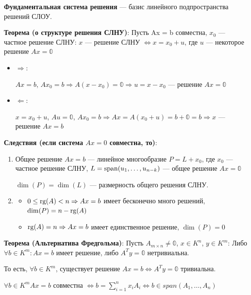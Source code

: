 \textbf{Фундаментальная система решения} --- базис линейного подпространства решений СЛОУ.

\textbf{Теорема (о структуре решения СЛНУ)}: Пусть Ax = b совместна, \(x_0\) --- частное решение СЛНУ: \(x\) --- решение СЛНУ \(\Leftrightarrow x = x_0 + u\), где \(u\) --- некоторое решение \(Ax = \mathbb{0}\)

\prooff{}
\begin{itemize}
    \item \(\Rightarrow\):

          \(Ax = b\), \(Ax_0 = b \Rightarrow A(x - x_0) = \mathbb{0} \Rightarrow u = x - x_0\) --- решение \(Ax = \mathbb{0}\)

    \item \(\Leftarrow\):

          \(x = x_0 + u\), \(Au = \mathbb{0}\), \(Ax_0 = b \Rightarrow Ax = A(x_0 + u) = b + \mathbb{0} = b \Rightarrow x\) --- решение \(Ax = b\)
\end{itemize}
\textbf{Следствия (если система $Ax=0$ совместна, то)}:
\begin{enumerate}
    \item Общее решение \(Ax = b\) --- линейное многообразие \(P = L + x_0\), где \(x_0\) --- частное решение СЛНУ, \(L = \operatorname{span}(u_1, \ldots, u_{n-k})\) --- общее решение \(Ax = \mathbb{0}\)

          \(\dim(P) = \dim(L)\) --- размерность общего решения СЛНУ.

    \item
          \begin{itemize}
              \item \(0 \leq \operatorname{rg}(A) < n \Rightarrow Ax = b\) имеет бесконечно много решений, \(\dim(P) = n - \operatorname{rg}(A)\)

              \item \(\operatorname{rg}(A) = n \Rightarrow Ax = b\) имеет единственное решение, \(\dim(P) = 0\)
          \end{itemize}
\end{enumerate}

\textbf{Теорема (Альтернатива Фредгольма)}: Пусть \(A_{m\times n} \neq \mathbb{0}\), \(x \in K^n\), \(y \in K^m\): Либо \(\forall b \in K^m: Ax = b\) имеет решение, либо \(A^Ty = \mathbb{0}\) нетривиальна.

То есть, \(\forall b \in K^m\), существует решение \(Ax = b \Leftrightarrow A^Ty = \mathbb{0}\) тривиальна.

\prooff{}
          \(\forall b \in K^m Ax = b\) совместна \(\Leftrightarrow b = \sum\limits_{i=1}^n x_iA_i  \Leftrightarrow b \in span(A_1,\ldots,A_n)\)

